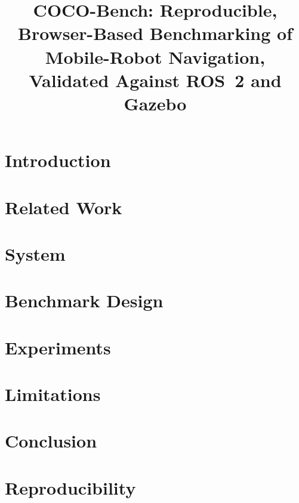 \documentclass[conference]{IEEEtran}
\begin{document}
\title{COCO-Bench: Reproducible, Browser-Based Benchmarking of Mobile-Robot Navigation, Validated Against ROS~2 and Gazebo}

\author{}

\maketitle

\begin{abstract}

\end{abstract}

\section{Introduction}\label{sec:intro}


\section{Related Work}\label{sec:related}


\section{System}\label{sec:system}


\section{Benchmark Design}\label{sec:bench}


\section{Experiments}\label{sec:experiments}


\section{Limitations}\label{sec:limits}


\section{Conclusion}\label{sec:conclusion}





\appendix
\section{Reproducibility}\label{sec:repro}

\end{document}
